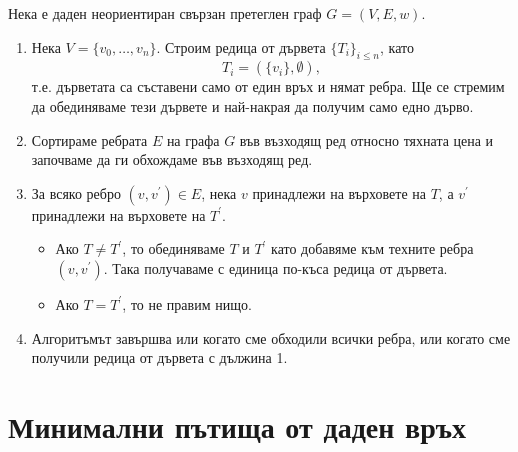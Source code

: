 Нека е даден неориентиран свързан претеглен граф $G = (V,E,w)$.
\begin{enumerate}
\item
  Нека $V = \{v_0,\dots,v_n\}$.
  Строим редица от дървета $\{T_i\}_{i \leq n}$, като
  \[T_i = (\{v_i\},\emptyset),\]
  т.е. дърветата са съставени само от един връх и нямат ребра.
  Ще се стремим да обединяваме тези дървете и най-накрая да получим само едно дърво.
\item
  Сортираме ребрата $E$ на графа $G$ във възходящ ред относно тяхната цена
  и започваме да ги обхождаме във възходящ ред.
\item
  За всяко ребро $(v,v^\prime) \in E$, нека $v$ принадлежи на върховете на $T$, а $v^\prime$ 
  принадлежи на върховете на $T^\prime$.
  \begin{itemize}
  \item 
    Ако $T \neq T^\prime$, то обединяваме $T$ и $T^\prime$ като добавяме към техните ребра $(v,v^\prime)$.
    Така получаваме с единица по-къса редица от дървета.
  \item
    Ако $T = T^\prime$, то не правим нищо.    
  \end{itemize}  
\item
  Алгоритъмът завършва или когато сме обходили всички ребра, или
  когато сме получили редица от дървета с дължина 1.
\end{enumerate}

\section{Минимални пътища от даден връх}

